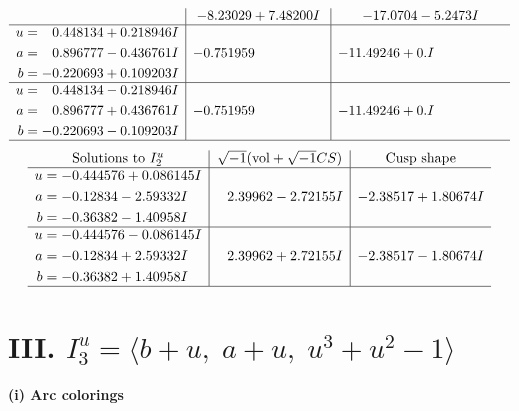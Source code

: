 \documentclass[1p]{elsarticle_modified}
\theoremstyle{definition}
\newcommand{\I}{\sqrt{-1}}
\begin{document}
$$\begin{array}{c|c|c}
 & -8.23029 + 7.48200 I & -17.0704 - 5.2473 I \\ \hline\begin{aligned}
u &= \phantom{-}0.448134 + 0.218946 I \\
a &= \phantom{-}0.896777 - 0.436761 I \\
b &= -0.220693 + 0.109203 I\end{aligned}
 & -0.751959\phantom{ +0.000000I} & -11.49246 + 0. I\phantom{ +0.000000I} \\ \hline\begin{aligned}
u &= \phantom{-}0.448134 - 0.218946 I \\
a &= \phantom{-}0.896777 + 0.436761 I \\
b &= -0.220693 - 0.109203 I\end{aligned}
 & -0.751959\phantom{ +0.000000I} & -11.49246 + 0. I\phantom{ +0.000000I}\\
 \hline 
 \end{array}$$\newpage$$\begin{array}{c|c|c}  
\text{Solutions to }I^u_{2}& \I (\text{vol} + \sqrt{-1}CS) & \text{Cusp shape}\\
 \hline 
\begin{aligned}
u &= -0.444576 + 0.086145 I \\
a &= -0.12834 - 2.59332 I \\
b &= -0.36382 - 1.40958 I\end{aligned}
 & \phantom{-}2.39962 - 2.72155 I & -2.38517 + 1.80674 I \\ \hline\begin{aligned}
u &= -0.444576 - 0.086145 I \\
a &= -0.12834 + 2.59332 I \\
b &= -0.36382 + 1.40958 I\end{aligned}
 & \phantom{-}2.39962 + 2.72155 I & -2.38517 - 1.80674 I\\
 \hline 
 \end{array}$$\newpage\newpage\renewcommand{\arraystretch}{1}
\centering \section*{III. $I^u_{3}= \langle b+u,\;a+u,\;u^3+u^2-1 \rangle$}
\flushleft \textbf{(i) Arc colorings}\\
\end{document}
